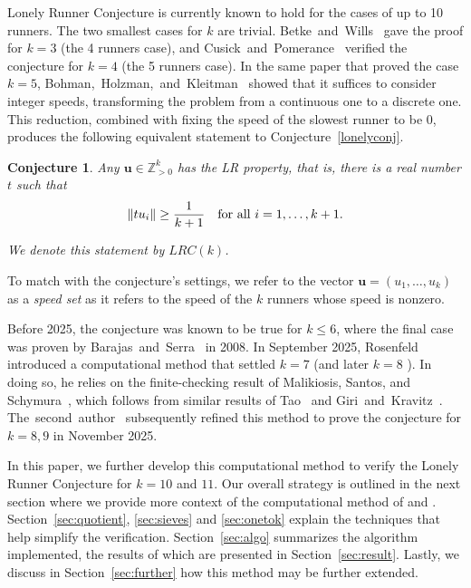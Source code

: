 \documentclass[11pt]{amsart}
\DeclarePairedDelimiter\norm{\lVert}{\rVert}
\newcommand{\Z}{\mathbb{Z}}
\newcommand{\ubf}{\mathbf{u}}
\newtheorem{conjecture}[theorem]{Conjecture}
\theoremstyle{definition}
\theoremstyle{remark}
\begin{document}
Lonely Runner Conjecture is currently known to hold for the cases of up to 10 runners.
The two smallest cases for $k$ are trivial. 
Betke~and~Wills~\cite{fourrunners} gave the proof for $k=3$ (the 4 runners case), 
and Cusick~and~Pomerance~\cite{cusick1984view} verified the conjecture for $k=4$ (the 5 runners case).
In the same paper that proved the case $k=5$, Bohman,~Holzman,~and~Kleitman~\cite{Bohman} showed that it suffices 
to consider integer speeds, transforming the problem from a continuous one to a discrete one. 
This reduction, combined with fixing the speed of the slowest runner to be $0$, produces the following
equivalent statement to Conjecture~\ref{lonelyconj}.

\begin{conjecture}
    Any $\ubf\in\Z_{>0}^k$ has the \emph{LR property}, that is, there is a real number $t$ such that
    \[\norm{tu_i}\geq\frac{1}{k+1} \quad \text{for all } i = 1,\dots,k+1.\] 
    
    We denote this statement by $LRC(k)$.
\end{conjecture}

To match with the conjecture's settings, we refer to the vector $\ubf = (u_1,\ldots,u_k)$ as a \emph{speed set} as 
it refers to the speed of the $k$ runners whose speed is nonzero.

Before 2025, the conjecture was known to be true for $k\leq6$, where the final case was proven by 
Barajas~and~Serra~\cite{barajas_lonely_2008} in 2008. In September 2025, Rosenfeld~\cite{Rosenfeld} introduced a computational 
method that settled $k=7$ (and later $k=8$ \cite{rosenfeld_lonely_2026}). In doing so, he relies on the finite-checking
result of Malikiosis, Santos, and Schymura~\cite{Malikiosis}, which follows from similar results of Tao~\cite{Tao} and
Giri~and~Kravitz~\cite{giri_structure_2026}. 
The~second~author~\cite{Trakulthongchai} subsequently refined this method to prove the conjecture for $k=8,9$ in November 2025.

In this paper, we further develop this computational method to verify the Lonely Runner Conjecture for $k=10$ and $11$. 
Our overall strategy is outlined in the next section where we provide more context of the computational method of \cite{Rosenfeld} 
and \cite{Trakulthongchai}. 
Section~\ref{sec:quotient}, \ref{sec:sieves} and \ref{sec:onetok} explain the techniques that help simplify the verification.
Section~\ref{sec:algo} summarizes the algorithm implemented, the results of which are presented in Section~\ref{sec:result}. 
Lastly, we discuss in Section~\ref{sec:further} how this method may be further extended. 
\end{document}
